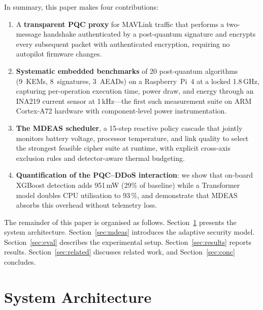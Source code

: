 \documentclass[conference]{IEEEtran}
\newcommand{\mdeas}{\textsc{MDEAS}}
\begin{document}
In summary, this paper makes four contributions:

\begin{enumerate}
  \item A \textbf{transparent PQC proxy} for MAVLink traffic that
    performs a two-message handshake authenticated by a post-quantum
    signature and encrypts every subsequent packet with authenticated
    encryption, requiring no autopilot firmware changes.

  \item \textbf{Systematic embedded benchmarks} of 20 post-quantum
    algorithms (9~KEMs, 8~signatures, 3~AEADs) on a Raspberry~Pi~4
    at a locked 1.8\,GHz, capturing per-operation execution time,
    power draw, and energy through an INA219 current sensor at
    1\,kHz---the first such measurement suite on ARM Cortex-A72
    hardware with component-level power instrumentation.

  \item \textbf{The \mdeas{} scheduler}, a 15-step reactive policy
    cascade that jointly monitors battery voltage, processor
    temperature, and link quality to select the strongest feasible
    cipher suite at runtime, with explicit cross-axis exclusion rules
    and detector-aware thermal budgeting.

  \item \textbf{Quantification of the PQC--DDoS interaction}: we show
    that on-board XGBoost detection adds 951\,mW (29\% of baseline)
    while a Transformer model doubles CPU utilisation to 93\,\%,
    and demonstrate that \mdeas{} absorbs this overhead without
    telemetry loss.
\end{enumerate}

The remainder of this paper is organised as follows.
Section~\ref{sec:arch} presents the system architecture.
Section~\ref{sec:mdeas} introduces the adaptive security model.
Section~\ref{sec:eval} describes the experimental setup.
Section~\ref{sec:results} reports results.
Section~\ref{sec:related} discusses related work, and
Section~\ref{sec:conc} concludes.


\section{System Architecture}
\label{sec:arch}
\end{document}
